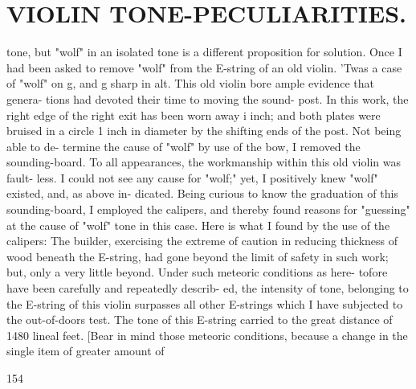 \documentclass{article}
\begin{document}
\section*{VIOLIN TONE-PECULIARITIES.}
tone, but "wolf" in an isolated tone is a different proposition for solution. Once I had been asked to remove "wolf" from the E-string of an old violin. 'Twas a case of "wolf" on g, and g sharp in alt. This old violin bore ample evidence that genera- tions had devoted their time to moving the sound- post. In this work, the right edge of the right exit has been worn away i inch; and both plates were bruised in a circle 1 inch in diameter by the shifting ends of the post. Not being able to de- termine the cause of "wolf" by use of the bow, I removed the sounding-board. To all appearances, the workmanship within this old violin was fault- less. I could not see any cause for "wolf;" yet, I positively knew "wolf" existed, and, as above in- dicated. Being curious to know the graduation of this sounding-board, I employed the calipers, and thereby found reasons for "guessing" at the cause of "wolf" tone in this case. Here is what I found by the use of the calipers: The builder, exercising the extreme of caution in reducing thickness of wood beneath the E-string, had gone beyond the limit of safety in such work; but, only a very little beyond. Under such meteoric conditions as here- tofore have been carefully and repeatedly describ- ed, the intensity of tone, belonging to the E-string of this violin surpasses all other E-strings which I have subjected to the out-of-doors test. The tone of this E-string carried to the great distance of 1480 lineal feet. [Bear in mind those meteoric conditions, because a change in the single item of greater amount of

154
\end{document}
